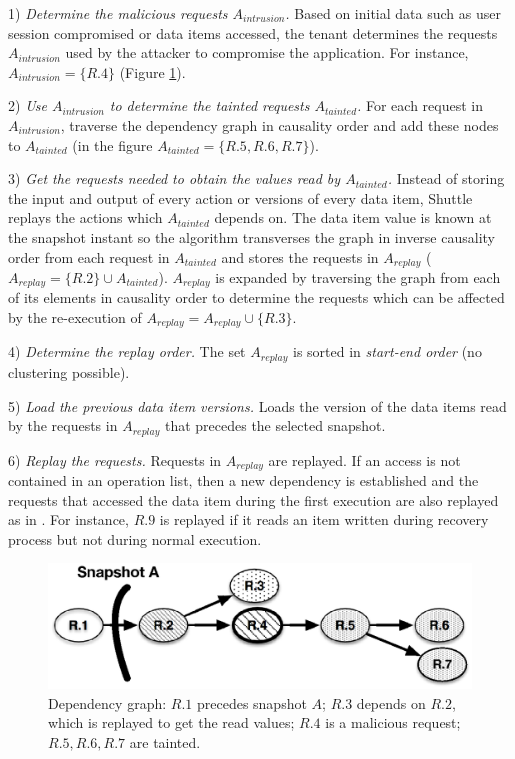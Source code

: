 {1)} \textit{Determine the malicious requests $A_{intrusion}$.}
  Based on initial data such as user session compromised or data items accessed, the tenant determines the requests $A_{intrusion}$ used by the attacker to compromise the application. For instance, $A_{intrusion} = \{R.4\} $ (Figure \ref{fig:selectiveGraph}).
  
{2)} \textit{Use $A_{intrusion}$ to determine the tainted requests $A_{tainted}$.}
  For each request in $A_{intrusion}$, traverse the dependency graph in causality order and add these nodes to $A_{tainted}$ (in the figure $A_{tainted} = \{R.5,R.6,R.7\}$).

{3)} \textit{Get the requests needed to obtain the values read by $A_{tainted}$.} %
  Instead of storing the input and output of every action or versions of every data item, Shuttle replays the actions which $A_{tainted}$ depends on. The data item value is known at the snapshot instant so the algorithm transverses the graph in inverse causality order from each request in $A_{tainted}$ and stores the requests in $A_{replay}$ ($A_{replay} = \{R.2\} \cup A_{tainted}$). $A_{replay}$ is expanded by traversing the graph from each of its elements in causality order to determine the requests which can be affected by the re-execution of $A_{replay} = A_{replay} \cup \{R.3\}$. 

{4)} \textit{Determine the replay order.} 
  The set $A_{replay}$ is sorted in \emph{start-end order} (no clustering possible).

{5)} \textit{Load the previous data item versions.}
  Loads the version of the data items read by the requests in $A_{replay}$ that precedes the selected snapshot.

{6)} \textit{Replay the requests.}
  Requests in $A_{replay}$ are replayed. If an access is not contained in an operation list, then a new dependency is established and the requests that accessed the data item during the first execution are also replayed as in \cite{retro}. For instance, $R.9$ is replayed if it reads an item written during recovery process but not during normal execution. 

\begin{figure}
  \centering
  \includegraphics[width=0.7\linewidth]{images/selectiveDependency_paper}
  \caption{{Dependency graph:} $R.1$ precedes snapshot $A$; $R.3$ depends on $R.2$, which is replayed to get the read values; $R.4$ is a malicious request; $R.5,R.6,R.7$ are tainted.}
  \label{fig:selectiveGraph}
\end{figure}


